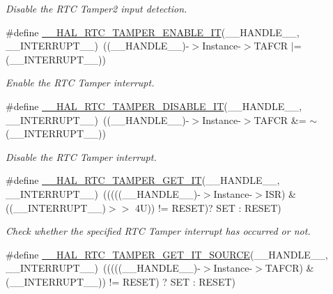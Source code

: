 \begin{DoxyCompactItemize}
\begin{DoxyCompactList}\small\item\em Disable the R\+TC Tamper2 input detection. \end{DoxyCompactList}\item 
\#define \hyperlink{group___r_t_c_ex___tamper_ga5897843380c7fcf865131c6bdb0fc3a1}{\+\_\+\+\_\+\+H\+A\+L\+\_\+\+R\+T\+C\+\_\+\+T\+A\+M\+P\+E\+R\+\_\+\+E\+N\+A\+B\+L\+E\+\_\+\+IT}(\+\_\+\+\_\+\+H\+A\+N\+D\+L\+E\+\_\+\+\_\+,  \+\_\+\+\_\+\+I\+N\+T\+E\+R\+R\+U\+P\+T\+\_\+\+\_\+)~((\+\_\+\+\_\+\+H\+A\+N\+D\+L\+E\+\_\+\+\_\+)-\/$>$Instance-\/$>$T\+A\+F\+CR $\vert$= (\+\_\+\+\_\+\+I\+N\+T\+E\+R\+R\+U\+P\+T\+\_\+\+\_\+))
\begin{DoxyCompactList}\small\item\em Enable the R\+TC Tamper interrupt. \end{DoxyCompactList}\item 
\#define \hyperlink{group___r_t_c_ex___tamper_ga669a86ef4feb560e2059bf8cfe4fa253}{\+\_\+\+\_\+\+H\+A\+L\+\_\+\+R\+T\+C\+\_\+\+T\+A\+M\+P\+E\+R\+\_\+\+D\+I\+S\+A\+B\+L\+E\+\_\+\+IT}(\+\_\+\+\_\+\+H\+A\+N\+D\+L\+E\+\_\+\+\_\+,  \+\_\+\+\_\+\+I\+N\+T\+E\+R\+R\+U\+P\+T\+\_\+\+\_\+)~((\+\_\+\+\_\+\+H\+A\+N\+D\+L\+E\+\_\+\+\_\+)-\/$>$Instance-\/$>$T\+A\+F\+CR \&= $\sim$(\+\_\+\+\_\+\+I\+N\+T\+E\+R\+R\+U\+P\+T\+\_\+\+\_\+))
\begin{DoxyCompactList}\small\item\em Disable the R\+TC Tamper interrupt. \end{DoxyCompactList}\item 
\#define \hyperlink{group___r_t_c_ex___tamper_ga20424c15833e5665016e87d1c8a0fdf4}{\+\_\+\+\_\+\+H\+A\+L\+\_\+\+R\+T\+C\+\_\+\+T\+A\+M\+P\+E\+R\+\_\+\+G\+E\+T\+\_\+\+IT}(\+\_\+\+\_\+\+H\+A\+N\+D\+L\+E\+\_\+\+\_\+,  \+\_\+\+\_\+\+I\+N\+T\+E\+R\+R\+U\+P\+T\+\_\+\+\_\+)~(((((\+\_\+\+\_\+\+H\+A\+N\+D\+L\+E\+\_\+\+\_\+)-\/$>$Instance-\/$>$I\+SR) \& ((\+\_\+\+\_\+\+I\+N\+T\+E\+R\+R\+U\+P\+T\+\_\+\+\_\+)$>$$>$ 4\+U)) != R\+E\+S\+E\+T)? S\+E\+T \+: R\+E\+S\+E\+T)
\begin{DoxyCompactList}\small\item\em Check whether the specified R\+TC Tamper interrupt has occurred or not. \end{DoxyCompactList}\item 
\#define \hyperlink{group___r_t_c_ex___tamper_gae1de3775214da8d45c4625d4ad2b6f28}{\+\_\+\+\_\+\+H\+A\+L\+\_\+\+R\+T\+C\+\_\+\+T\+A\+M\+P\+E\+R\+\_\+\+G\+E\+T\+\_\+\+I\+T\+\_\+\+S\+O\+U\+R\+CE}(\+\_\+\+\_\+\+H\+A\+N\+D\+L\+E\+\_\+\+\_\+,  \+\_\+\+\_\+\+I\+N\+T\+E\+R\+R\+U\+P\+T\+\_\+\+\_\+)~(((((\+\_\+\+\_\+\+H\+A\+N\+D\+L\+E\+\_\+\+\_\+)-\/$>$Instance-\/$>$T\+A\+F\+CR) \& (\+\_\+\+\_\+\+I\+N\+T\+E\+R\+R\+U\+P\+T\+\_\+\+\_\+)) != R\+E\+S\+ET) ? S\+ET \+: R\+E\+S\+ET)
$$
\end{DoxyCompactItemize}
